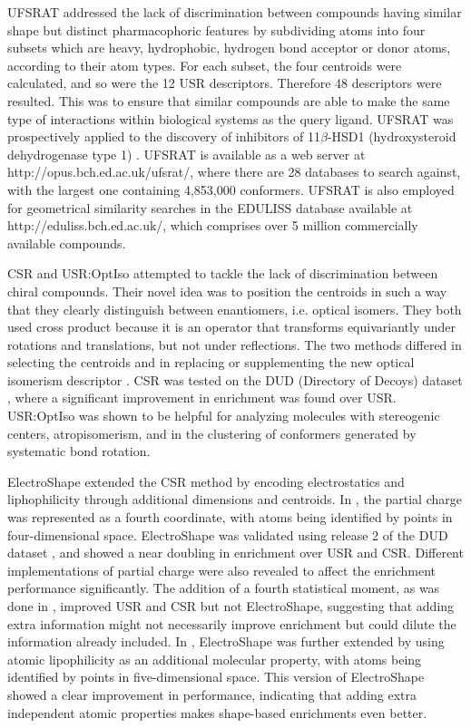 UFSRAT \citep{1436} addressed the lack of discrimination between compounds having similar shape but distinct pharmacophoric features by subdividing atoms into four subsets which are heavy, hydrophobic, hydrogen bond acceptor or donor atoms, according to their atom types. For each subset, the four centroids were calculated, and so were the 12 USR descriptors. Therefore 48 descriptors were resulted. This was to ensure that similar compounds are able to make the same type of interactions within biological systems as the query ligand. UFSRAT was prospectively applied to the discovery of inhibitors of 11$\beta$-HSD1 (hydroxysteroid dehydrogenase type 1) \citep{1505}. UFSRAT is available as a web server at http://opus.bch.ed.ac.uk/ufsrat/, where there are 28 databases to search against, with the largest one containing 4,853,000 conformers. UFSRAT is also employed for geometrical similarity searches in the EDULISS database \citep{1437} available at http://eduliss.bch.ed.ac.uk/, which comprises over 5 million commercially available compounds.

CSR \citep{1334} and USR:OptIso \citep{1335} attempted to tackle the lack of discrimination between chiral compounds. Their novel idea was to position the centroids in such a way that they clearly distinguish between enantiomers, i.e. optical isomers. They both used cross product because it is an operator that transforms equivariantly under rotations and translations, but not under reflections. The two methods differed in selecting the centroids and in replacing or supplementing the new optical isomerism descriptor \citep{1335}. CSR \citep{1334} was tested on the DUD (Directory of Decoys) dataset \citep{87}, where a significant improvement in enrichment was found over USR. USR:OptIso \citep{1335} was shown to be helpful for analyzing molecules with stereogenic centers, atropisomerism, and in the clustering of conformers generated by systematic bond rotation.

ElectroShape \citep{1337,1338} extended the CSR \citep{1334} method by encoding electrostatics and liphophilicity through additional dimensions and centroids. In \citep{1337}, the partial charge was represented as a fourth coordinate, with atoms being identified by points in four-dimensional space. ElectroShape was validated using release 2 of the DUD dataset \citep{87}, and showed a near doubling in enrichment over USR and CSR. Different implementations of partial charge were also revealed to affect the enrichment performance significantly. The addition of a fourth statistical moment, as was done in \citep{1333}, improved USR and CSR but not ElectroShape, suggesting that adding extra information might not necessarily improve enrichment but could dilute the information already included. In \citep{1338}, ElectroShape was further extended by using atomic lipophilicity as an additional molecular property, with atoms being identified by points in five-dimensional space. This version of ElectroShape showed a clear improvement in performance, indicating that adding extra independent atomic properties makes shape-based enrichments even better.

